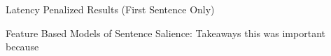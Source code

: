 \begin{frame}{Latency Penalized Results (First Sentence Only)}
\centering
{}

\end{frame}

\begin{frame}{Feature Based Models of Sentence Salience: Takeaways}
  this was important because

\end{frame}

